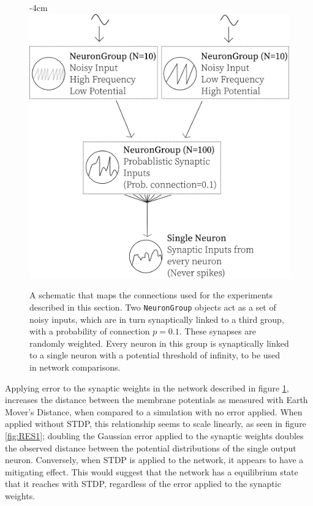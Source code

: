 \begin{figure}[h!]
    \centering
    \addtolength{\leftskip} {-4cm}
    \addtolength{\rightskip}{-4cm}
    \includegraphics[width=0.8\linewidth]{figures/tops/ExperimentLayout.png}
    \caption[Example Network Setup]{A schematic that maps the connections used for the experiments described in this section. Two \texttt{NeuronGroup} objects act as a set of noisy inputs, which are in turn synaptically linked to a third group, with a probability of connection $p=0.1$. These synapses are randomly weighted. Every neuron in this group is synaptically linked to a single neuron with a potential threshold of infinity, to be used in network comparisons.}
    \label{fig:RES1TOP}
\end{figure}
\FloatBarrier

Applying error to the synaptic weights in the network described in figure
\ref{fig:RES1TOP}, increases the distance between the membrane potentials as
measured with Earth Mover's Distance, when compared to a simulation with no
error applied. When applied without STDP, this relationship seems to scale
linearly, as seen in figure \ref{fig:RES1}; doubling the Gaussian error applied
to the synaptic weights doubles the observed distance between the potential
distributions of the single output neuron. Conversely, when STDP is applied to
the network, it appears to have a mitigating effect. This would suggest that the
network has a equilibrium state that it reaches with STDP, regardless of the
error applied to the synaptic weights.

